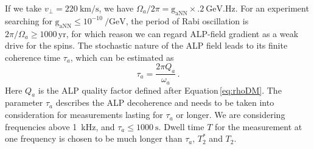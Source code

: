 If we take $v_{\bot} = \SI{220}{\km\per\second}$, we have $\Omega_a/2\pi=\mathrm{g_{aNN}}\times\SI{.2}{\GeV.\Hz}$. For an experiment searching for $\mathrm{g_{aNN}}\leq 10^{-10}\SI{}{\per\GeV}$, the period of Rabi oscillation is $2\pi/\Omega_a \geq 1000\,\mathrm{yr}$, for which reason we can regard ALP-field gradient as a weak drive for the spins. 
The stochastic nature of the ALP field \cite{Centers2021Stochastic, Gramolin2022_SpectralPhysRevD} leads to its finite coherence time $\tau_a$, which can be estimated as
\begin{equation}
    \tau_a = \dfrac{2\pi Q_a}{\omega_a}
    \,.\label{eq:taua_Qa_omegaa}
\end{equation}
Here $Q_a$ is the ALP quality factor defined after Equation\,\eqref{eq:rhoDM}.
The parameter $\tau_a$ describes the ALP decoherence and needs to be taken into consideration for measurements lasting for $\tau_a$ or longer. 
We are considering frequencies above \SI{1}{\kHz}, and $\tau_a \leq \SI{1000}{\second}$. Dwell time $T$ for the measurement at one frequency is chosen to be much longer than $\tau_a,\, T_2^*$ and $T_2$.
